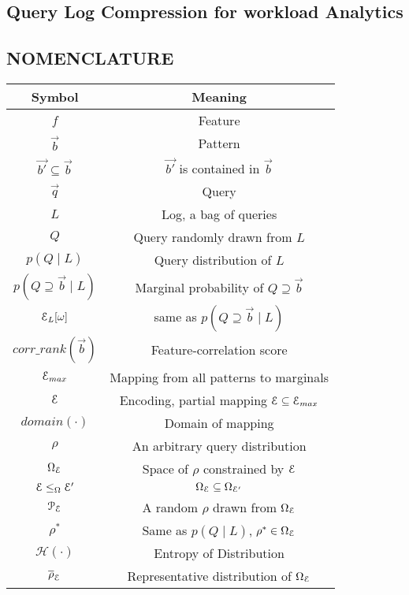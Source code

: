 \begin{appendices}
\chapter{Query Log Compression for workload Analytics}
\section{NOMENCLATURE}
 \begin{tabular}{|c c|} 
 \hline
 \textbf{Symbol} & \textbf{Meaning}  \\ [0.5ex] 
 \hline\hline
 $f$ & Feature\\ 
 \hline
 $\vec{b}$ & Pattern \\
 \hline
  $\vec{b'} \subseteq \vec{b}$ & $\vec{b'}$ is contained in $\vec{b}$\\
 \hline  
 $\vec{q}$ & Query\\
 \hline
 $L$ & Log, a bag of queries\\
  \hline
 $Q$ & Query randomly drawn from $L$\\
 \hline 
  $p(Q\;|\;L)$ & Query distribution of $L$\\
 \hline
 $p(Q\supseteq\vec{b}\;|\;L)$ & Marginal probability of $Q\supseteq\vec b$\\
 \hline
  $\mathcal E_L[\omega]$ & same as  $p(Q\supseteq\vec{b}\;|\;L)$\\
 \hline
   $corr\_rank(\vec{b})$ & Feature-correlation score\\ 
 \hline 
  $\mathcal E_{max}$ & Mapping from all patterns to marginals\\
 \hline 
  $\mathcal E$ & Encoding, partial mapping $\mathcal E \subseteq \mathcal E_{max}$\\
  \hline 
  $domain(\cdot)$ & Domain of mapping\\
 \hline
  $\rho$ & An arbitrary query distribution\\
 \hline
  $\Omega_\mathcal E$ & Space of $\rho$ constrained by $\mathcal E$\\
 \hline
   $\mathcal E\leq_{\Omega}\mathcal E'$ & $\Omega_{\mathcal E}\subseteq\Omega_{\mathcal E'}$\\ 
   \hline
   $\mathcal{P}_{\mathcal E}$ & A random $\rho$ drawn from $\Omega_\mathcal E$\\
  \hline 
  $\rho^*$ & Same as $p(Q\;|\;L)$, $\rho^*\in\Omega_\mathcal E$\\
 \hline 
    $\mathcal{H}(\cdot)$ & Entropy of Distribution\\
 \hline 
  $\overline{\rho}_\mathcal E$ & Representative distribution of $\Omega_\mathcal E$\\

\end{tabular}
\end{appendices}
